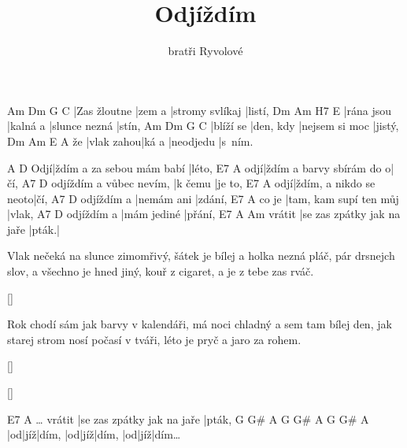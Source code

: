 \documentclass{song}
\title{Odjíždím}
\author{bratři Ryvolové}
\begin{document}
\strophe
Am           Dm     G               C
|Zas žloutne |zem a |stromy svlíkaj |listí,
Dm         Am       H7            E
|rána jsou |kalná a |slunce nezná |stín,
Am        Dm        G              C
|blíží se |den, kdy |nejsem si moc |jistý,
   Dm         Am    E         A
že |vlak zahou|ká a |neodjedu |s~ním.
\endstrophe

    A                         D
Odjí|ždím a za sebou mám babí |léto,
    E7                       A
odjí|ždím a barvy sbírám do o|čí,
                        A7      D
odjíždím a vůbec nevím, |k čemu |je to,
    E7                     A
odjí|ždím, a nikdo se neoto|čí,
           A7         D
odjíždím a |nemám ani |zdání,
      E7                     A
co je |tam, kam supí ten můj |vlak,
           A7          D
odjíždím a |mám jediné |přání,
       E7                         A     Am
vrátit |se zas zpátky jak na jaře |pták.|
\endstrophe

\strophe*
Vlak nečeká na slunce zimomřivý,
šátek je bílej a holka nezná pláč,
pár drsnejch slov, a všechno je hned jiný,
kouř z cigaret, a je z tebe zas rváč.
\endstrophe

\ref{}

\strophe*
Rok chodí sám jak barvy v kalendáři,
má noci chladný a sem tam bílej den,
jak starej strom nosí počasí v tváři,
léto je pryč a jaro za rohem.
\endstrophe

\ref{}

\ref{}

\strophe
                E7                         A
\ldots{} vrátit |se zas zpátky jak na jaře |pták,
G  G\# A     G  G\# A     G  G\# A
|od|jíž|dím, |od|jíž|dím, |od|jíž|dím\ldots
\endstrophe
\end{document}
